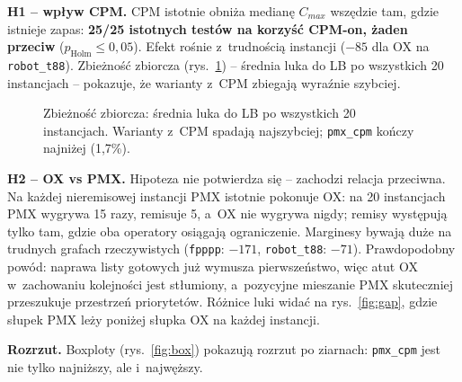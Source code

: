 \documentclass[12pt,a4paper]{article}
\begin{document}
\textbf{H1 -- wpływ CPM.} CPM istotnie obniża medianę $C_{max}$ wszędzie tam, gdzie istnieje zapas:
\textbf{25/25 istotnych testów na korzyść CPM-on, żaden przeciw} ($p_{\text{Holm}}\le 0{,}05$). Efekt
rośnie z~trudnością instancji ($-85$ dla OX na \texttt{robot\_t88}). Zbieżność zbiorcza
(rys.~\ref{fig:convagg}) -- średnia luka do LB po wszystkich 20 instancjach -- pokazuje, że warianty
z~CPM zbiegają wyraźnie szybciej.

\begin{figure}[H]
\centering
{}
\caption{Zbieżność zbiorcza: średnia luka do LB po wszystkich 20 instancjach. Warianty z~CPM
spadają najszybciej; \texttt{pmx\_cpm} kończy najniżej (1,7\%).}
\label{fig:convagg}
\end{figure}

\textbf{H2 -- OX vs PMX.} Hipoteza nie potwierdza się -- zachodzi relacja przeciwna. Na każdej
nieremisowej instancji PMX istotnie pokonuje OX: na 20 instancjach PMX wygrywa 15 razy, remisuje 5,
a~OX nie wygrywa nigdy; remisy występują tylko tam, gdzie oba operatory
osiągają ograniczenie. Marginesy bywają duże na trudnych grafach rzeczywistych (\texttt{fpppp}:
$-171$, \texttt{robot\_t88}: $-71$). Prawdopodobny powód: naprawa listy gotowych już wymusza
pierwszeństwo, więc atut OX w~zachowaniu kolejności jest stłumiony, a~pozycyjne mieszanie PMX
skuteczniej przeszukuje przestrzeń priorytetów. Różnice luki widać na rys.~\ref{fig:gap}, gdzie
słupek PMX leży poniżej słupka OX na każdej instancji.

\textbf{Rozrzut.} Boxploty (rys.~\ref{fig:box}) pokazują rozrzut po ziarnach: \texttt{pmx\_cpm} jest
nie tylko najniższy, ale i~najwęższy.
\end{document}
